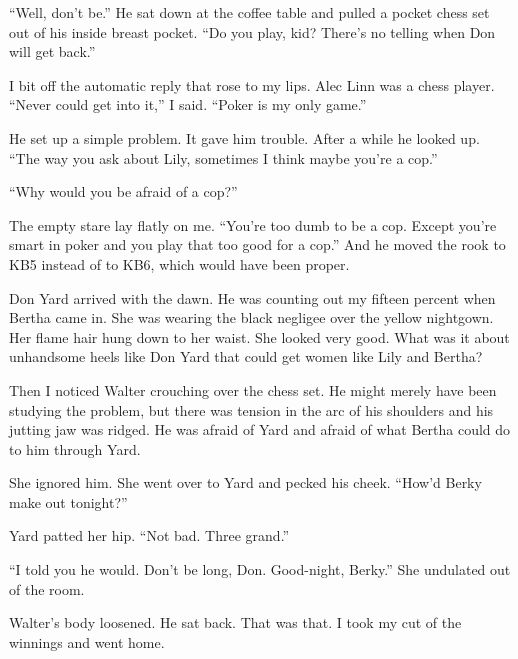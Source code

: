 {“Well, don’t be.” He sat down at the coffee table and pulled a pocket chess set out of his inside breast pocket. “Do you play, kid? There’s no telling when Don will get back.”

I bit off the automatic reply that rose to my lips. Alec Linn was a chess player. “Never could get into it,” I said. “Poker is my only game.”

He set up a simple problem. It gave him trouble. After a while he looked up. “The way you ask about Lily, sometimes I think maybe you’re a cop.”

“Why would you be afraid of a cop?”

The empty stare lay flatly on me. “You’re too dumb to be a cop. Except you’re smart in poker and you play that too good for a cop.” And he moved the rook to KB5 instead of to KB6, which would have been proper.

Don Yard arrived with the dawn. He was counting out my fifteen percent when Bertha came in. She was wearing the black negligee over the yellow nightgown. Her flame hair hung down to her waist. She looked very good. What was it about unhandsome heels like Don Yard that could get women like Lily and Bertha?

Then I noticed Walter crouching over the chess set. He might merely have been studying the problem, but there was tension in the arc of his shoulders and his jutting jaw was ridged. He was afraid of Yard and afraid of what Bertha could do to him through Yard.

She ignored him. She went over to Yard and pecked his cheek. “How’d Berky make out tonight?”

Yard patted her hip. “Not bad. Three grand.”

“I told you he would. Don’t be long, Don. Good-night, Berky.” She undulated out of the room.

Walter’s body loosened. He sat back. That was that. I took my cut of the winnings and went home.

}

\vspace{2\nbs}
\clearpage
\thispagestyle{empty}


